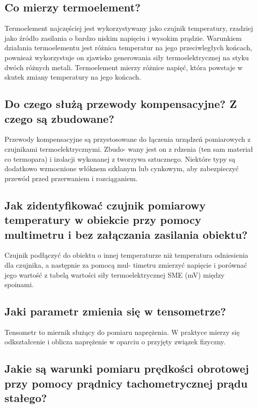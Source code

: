 \documentclass{article}
\begin{document}
\subsection{Co mierzy termoelement?}
Termoelement najczęściej jest wykorzystywany jako czujnik temperatury, rzadziej jako źródło zasilania o bardzo niskim
napięciu i wysokim prądzie. Warunkiem działania termoelementu jest różnica temperatur na jego przeciwległych końcach,
pownieaż wykorzystuje on zjawisko generowania siły termoelektrycznej na styku dwóch różnych metali. Termoelement
mierzy różnice napięć, która powstaje w skutek zmiany temperatury na jego końcach.

\subsection{Do czego służą przewody kompensacyjne? Z czego są zbudowane?}
Przewody kompensacyjne są przystosowane do łączenia urządzeń pomiarowych z czujnikami termoelektrycznymi. Zbudo-
wany jest on z rdzenia (ten sam materiał co termopara) i izolacji wykonanej z tworzywa sztucznego. Niektóre typy są
dodatkowo wzmocnione włóknem szklanym lub cynkowym, aby zabezpieczyć przewód przed przerwaniem i rozciąganiem.

\subsection{Jak zidentyfikować czujnik pomiarowy temperatury w obiekcie przy pomocy multimetru i bez załączania zasilania obiektu?}

Czujnik podłączyć do obiektu o innej temperaturze niż temperatura odniesienia dla czujnika, a następnie za pomocą mul-
timetru zmierzyć napięcie i porównać jego wartość z tabelą wartości siły termoelektrycznej SME (mV) między spoinami.

\subsection{Jaki parametr zmienia się w tensometrze?}

Tensometr to miernik służący do pomiaru naprężenia. W praktyce mierzy się odkształcenie i oblicza naprężenie w oparciu
o przyjęty związek fizyczny.

\subsection{Jakie są warunki pomiaru prędkości obrotowej przy pomocy prądnicy tachometrycznej prądu stałego?}
\end{document}
